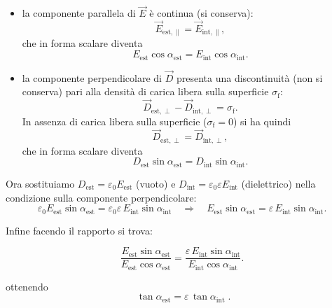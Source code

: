 \documentclass{book}
\begin{document}
\begin{itemize}
  \item la componente parallela di \(\vec{E}\) è continua (si conserva):
  \[
  \vec{E}_{\mathrm{est},\parallel}=\vec{E}_{\mathrm{int},\parallel},
  \]
  che in forma scalare diventa
  \[
  E_{\mathrm{est}}\cos\alpha_{\mathrm{est}} = E_{\mathrm{int}}\cos\alpha_{\mathrm{int}}.
  \]

  \item la componente perpendicolare di \(\vec{D}\) presenta una discontinuità (non si conserva) pari alla densità di carica libera sulla superficie \(\sigma_{\mathrm{f}}\):
  \[
  \vec{D}_{\mathrm{est},\perp}-\vec{D}_{\mathrm{int},\perp}=\sigma_{\mathrm{f}}.
  \]
  In assenza di carica libera sulla superficie (\(\sigma_{\mathrm{f}}=0\)) si ha quindi
  \[
  \vec{D}_{\mathrm{est},\perp}=\vec{D}_{\mathrm{int},\perp},
  \]
  che in forma scalare diventa
  \[
  D_{\mathrm{est}}\sin\alpha_{\mathrm{est}} = D_{\mathrm{int}}\sin\alpha_{\mathrm{int}}.
  \]
\end{itemize}
\vspace{0.2cm}
Ora sostituiamo \(D_{\mathrm{est}}=\varepsilon_0 E_{\mathrm{est}}\) (vuoto) e \(D_{\mathrm{int}}=\varepsilon_0\varepsilon E_{\mathrm{int}}\) (dielettrico) nella condizione sulla componente perpendicolare:
\[
\varepsilon_0 E_{\mathrm{est}}\sin\alpha_{\mathrm{est}}
= \varepsilon_0\varepsilon\,E_{\mathrm{int}}\sin\alpha_{\mathrm{int}}
\quad\Longrightarrow\quad
E_{\mathrm{est}}\sin\alpha_{\mathrm{est}} = \varepsilon\,E_{\mathrm{int}}\sin\alpha_{\mathrm{int}}.
\]

Infine facendo il rapporto si trova:

\[
\frac{E_{\mathrm{est}}\sin\alpha_{\mathrm{est}}}{E_{\mathrm{est}}\cos\alpha_{\mathrm{est}}}
= \frac{\varepsilon\,E_{\mathrm{int}}\sin\alpha_{\mathrm{int}}}{E_{\mathrm{int}}\cos\alpha_{\mathrm{int}}}.
\]

ottenendo
\[
\boxed{\;\tan\alpha_{\mathrm{est}}=\varepsilon\,\tan\alpha_{\mathrm{int}}\; }.
\]

\end{document}
